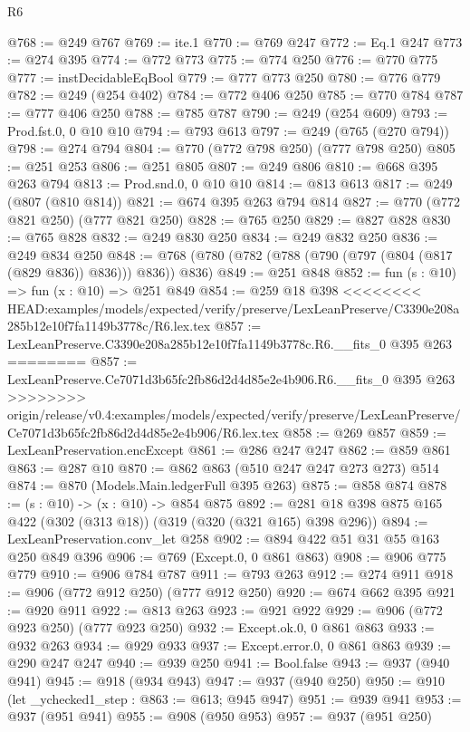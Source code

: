 \begin{lexlean}{R6}
\begin{coremodule}
{{{{{{{{{{{{{{{@768 := @249 @767
@769 := ite.{1}
@770 := @769 @247
@772 := Eq.{1} @247
@773 := @274 @395
@774 := @772 @773
@775 := @774 @250
@776 := @770 @775
@777 := instDecidableEqBool
@779 := @777 @773 @250
@780 := @776 @779
@782 := @249 (@254 @402)
@784 := @772 @406 @250
@785 := @770 @784
@787 := @777 @406 @250
@788 := @785 @787
@790 := @249 (@254 @609)
@793 := Prod.fst.{0, 0} @10 @10
@794 := @793 @613
@797 := @249 (@765 (@270 @794))
@798 := @274 @794
@804 := @770 (@772 @798 @250) (@777 @798 @250)
@805 := @251 @253
@806 := @251 @805
@807 := @249 @806
@810 := @668 @395 @263 @794
@813 := Prod.snd.{0, 0} @10 @10
@814 := @813 @613
@817 := @249 (@807 (@810 @814))
@821 := @674 @395 @263 @794 @814
@827 := @770 (@772 @821 @250) (@777 @821 @250)
@828 := @765 @250
@829 := @827 @828
@830 := @765 @828
@832 := @249 @830 @250
@834 := @249 @832 @250
@836 := @249 @834 @250
@848 := @768 (@780 (@782 (@788 (@790 (@797 (@804 (@817 (@829 @836)) @836))) @836)) @836)
@849 := @251 @848
@852 := fun (s : @10) => fun (x : @10) => @251 @849
@854 := @259 @18 @398
<<<<<<<< HEAD:examples/models/expected/verify/preserve/LexLeanPreserve/C3390e208a285b12e10f7fa1149b3778c/R6.lex.tex
@857 := LexLeanPreserve.C3390e208a285b12e10f7fa1149b3778c.R6.__fits_0 @395 @263
========
@857 := LexLeanPreserve.Ce7071d3b65fc2fb86d2d4d85e2e4b906.R6.__fits_0 @395 @263
>>>>>>>> origin/release/v0.4:examples/models/expected/verify/preserve/LexLeanPreserve/Ce7071d3b65fc2fb86d2d4d85e2e4b906/R6.lex.tex
@858 := @269 @857
@859 := LexLeanPreservation.encExcept
@861 := @286 @247 @247
@862 := @859 @861
@863 := @287 @10
@870 := @862 @863 (@510 @247 @247 @273 @273) @514
@874 := @870 (Models.Main.ledgerFull @395 @263)
@875 := @858 @874
@878 := (s : @10) -> (x : @10) -> @854 @875
@892 := @281 @18 @398 @875 @165 @422 (@302 (@313 @18)) (@319 (@320 (@321 @165) @398 @296))
@894 := LexLeanPreservation.conv_let @258
@902 := @894 @422 @51 @31 @55 @163 @250 @849 @396
@906 := @769 (Except.{0, 0} @861 @863)
@908 := @906 @775 @779
@910 := @906 @784 @787
@911 := @793 @263
@912 := @274 @911
@918 := @906 (@772 @912 @250) (@777 @912 @250)
@920 := @674 @662 @395
@921 := @920 @911
@922 := @813 @263
@923 := @921 @922
@929 := @906 (@772 @923 @250) (@777 @923 @250)
@932 := Except.ok.{0, 0} @861 @863
@933 := @932 @263
@934 := @929 @933
@937 := Except.error.{0, 0} @861 @863
@939 := @290 @247 @247
@940 := @939 @250
@941 := Bool.false
@943 := @937 (@940 @941)
@945 := @918 (@934 @943)
@947 := @937 (@940 @250)
@950 := @910 (let _ychecked1_step : @863 := @613; @945 @947)
@951 := @939 @941
@953 := @937 (@951 @941)
@955 := @908 (@950 @953)
@957 := @937 (@951 @250)
}}}}}}}}}}}}}}}
\end{coremodule}
\end{lexlean}
